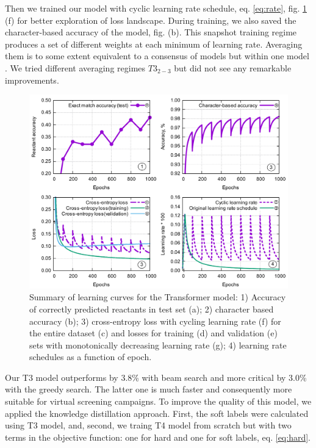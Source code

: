 \documentclass{article}
\begin{document}
Then we trained our model with cyclic learning rate schedule, eq. \ref{eq:rate}, fig. \ref{fig:example} (f) for better exploration of loss landscape. During training, we also saved the character-based accuracy of the model, fig. (b). This snapshot training regime \cite{Snapshot} produces a set of different weights at each minimum of learning rate. Averaging them is to some extent equivalent to a consensus of models but within one model \cite{Izmailov}. We tried different averaging regimes $T3_{2-3}$ but did not see any remarkable improvements. 
\begin{figure}[t!]
  \centering
  \includegraphics[width = 17cm]{images/learning.pdf}
  \caption{Summary of learning curves for the Transformer model: 1) Accuracy of correctly predicted reactants in test set (a); 2) character based accuracy (b); 3) cross-entropy loss with cycling learning rate (f) for the entire dataset (c) and losses for training (d) and validation (e) sets with monotonically decreasing learning rate (g); 4) learning rate schedules as a function of epoch.}
  \label{fig:example}
\end{figure}

Our T3 model outperforms \cite{Pande} by 3.8\% with beam search and more critical by 3.0\% with the greedy search. The latter one is much faster and consequently more suitable for virtual screening campaigns. To improve the quality of this model, we applied the knowledge distillation approach. First, the soft labels were calculated using T3 model, and, second, we traing T4 model from scratch but with two terms in the objective function: one for hard and one for soft labels, eq. \ref{eq:hard}. 
\end{document}
